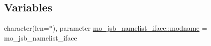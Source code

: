 \subsection*{Variables}
\begin{DoxyCompactItemize}
\item 
character(len=$\ast$), parameter \hyperlink{namespacemo__jsb__namelist__iface_ac285553fa6612b5913578b420275d81b}{mo\+\_\+jsb\+\_\+namelist\+\_\+iface\+::modname} = \textquotesingle{}mo\+\_\+jsb\+\_\+namelist\+\_\+iface\textquotesingle{}
\end{DoxyCompactItemize}
